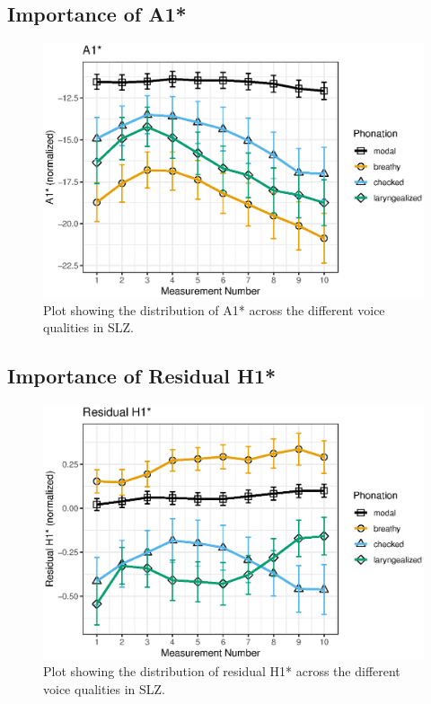 \subsection{Importance of A1*} \label{sec:bagging_a1}

\begin{figure}[!h]
    \centering
    \includegraphics[width = 0.9\linewidth]{images/slz_a1c.eps}
    \caption{Plot showing the distribution of A1* across the different voice qualities in SLZ.}
    \label{fig:a1}
\end{figure}
\subsection{Importance of Residual H1*} \label{sec:bagging_residual}
\begin{figure}[!h]
    \centering
    \includegraphics[width = 0.9\linewidth]{images/slz_residual_h1c.eps}
    \caption{Plot showing the distribution of residual H1* across the different voice qualities in SLZ.}
    \label{fig:residualH1}
\end{figure}

